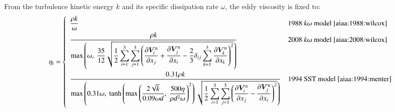\documentclass{warpdoc}
\newcommand{\alb}{\vspace{0.1cm}\\} %
\newcommand{\mfd}{\displaystyle}
\newcommand{\visc}{\eta}
\renewcommand{\vec}[1]{\bm{#1}}
\begin{document}
%
From the turbulence kinetic energy $k$ and its specific dissipation rate $\omega$, the eddy viscosity is fixed to:
%
\begin{equation}
\visc_{\rm t}=\left\{
\begin{array}{ll}\mfd
\frac{\rho k}{\omega} & \textrm{1988~$k\omega$~model \cite{aiaa:1988:wilcox}}\alb\mfd
\mfd \frac{\rho k}{{\rm max}\left(\omega,~\mfd\frac{35}{12}\sqrt{\frac{1}{2}\sum_{i=1}^3\sum_{j=1}^3\left(\frac{\partial \vec{V}^{\rm n}_i}{\partial x_j}+\frac{\partial \vec{V}^{\rm n}_j}{\partial x_i}-\frac{2}{3}\delta_{ij}\sum_{k=1}^{3} \frac{\partial \vec{V}^{\rm n}_k}{\partial x_k}\right)^2}\right)}
 & \textrm{2008~$k\omega$~model \cite{aiaa:2008:wilcox}} \alb
\mfd \frac{0.31 \rho k} {\max \left(
0.31 \omega,
~\mfd {\rm tanh} \left(\max\left(\frac{2 \sqrt{k}}{0.09 \omega d} ,~ \frac{500 \visc}{\rho d^2 \omega}\right)^2 \right)\sqrt{
\frac{1}{2}\sum_{i=1}^3\sum_{j=1}^3\left(
\frac{\partial \vec{V}^{\rm n}_i}{\partial x_j}-\frac{\partial \vec{V}^{\rm n}_j}{\partial x_i}
\right)^2
} %
\right)}
 & \textrm{1994 SST model \cite{aiaa:1994:menter}} \alb
\end{array}
\right.
\end{equation}
%
\end{document}
